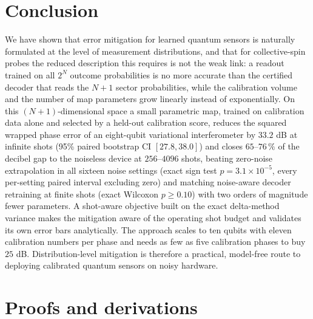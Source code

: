 \documentclass[ASNA,twocolumn]{USG}
\begin{document}
\section{Conclusion}
\label{sec:conclusion}

We have shown that error mitigation for learned quantum sensors is naturally
formulated at the level of measurement distributions, and that for
collective-spin probes the reduced description this requires is not the weak
link: a readout trained on all $2^N$ outcome probabilities is no more accurate
than the certified decoder that reads the $N+1$ sector probabilities, while the
calibration volume and the number of map parameters grow linearly instead of
exponentially.  On this $(N+1)$-dimensional space a small parametric map, trained
on calibration data alone and selected by a held-out calibration score, reduces
the squared wrapped phase error of an eight-qubit variational interferometer by
$33.2$ dB at infinite shots (95\% paired bootstrap CI $[27.8,38.0]$) and closes
$65$--$76\,\%$ of the decibel gap to the noiseless
device at $256$--$4096$ shots, beating zero-noise extrapolation in all sixteen
noise settings (exact sign test $p=3.1\times10^{-5}$, every per-setting paired
interval excluding zero) and matching noise-aware decoder retraining at finite
shots (exact Wilcoxon $p\ge0.10$) with
two orders of magnitude fewer parameters.  A shot-aware objective built on the
exact delta-method variance makes the mitigation aware of the operating shot
budget and validates its own error bars analytically.  The approach scales to
ten qubits with eleven calibration numbers per phase and needs as few as five
calibration phases to buy $25$ dB.  Distribution-level mitigation is
therefore a practical, model-free route to deploying calibrated quantum sensors
on noisy hardware.

\appendix

\section{Proofs and derivations}
\label{app:proofs}
\end{document}
